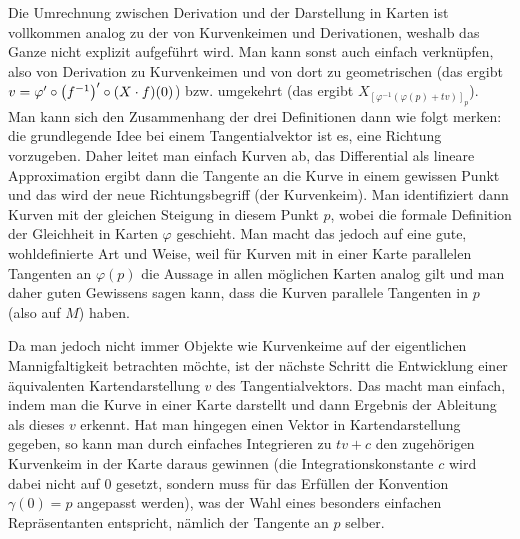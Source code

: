\documentclass[../H_Analysis_main.tex]{subfiles}
\begin{document}
Die Umrechnung zwischen Derivation und der Darstellung in Karten ist vollkommen analog zu der von Kurvenkeimen und Derivationen, weshalb das Ganze nicht explizit aufgeführt wird. Man kann sonst auch einfach verknüpfen, also von Derivation zu Kurvenkeimen und von dort zu geometrischen (das ergibt %
$v = \varphi' \circ \qty(f^{-1})' \circ \qty(X \cdot f)(0)$) bzw. umgekehrt (das ergibt $X_{[\varphi^{-1}(\varphi(p) + tv)]_p}$).\\


Man kann sich den Zusammenhang der drei Definitionen dann wie folgt merken: die grundlegende Idee bei einem Tangentialvektor ist es, eine Richtung vorzugeben. Daher leitet man einfach Kurven ab, das Differential als lineare Approximation ergibt dann die Tangente an die Kurve in einem gewissen Punkt und das wird der neue Richtungsbegriff (der Kurvenkeim). Man identifiziert dann Kurven mit der gleichen Steigung in diesem Punkt $p$, wobei die formale Definition der Gleichheit in Karten $\varphi$ geschieht. Man macht das jedoch auf eine gute, wohldefinierte Art und Weise, weil für Kurven mit in einer Karte parallelen Tangenten an $\varphi(p)$ die Aussage in allen möglichen Karten analog gilt und man daher guten Gewissens sagen kann, dass die Kurven parallele Tangenten in $p$ (also auf $M$) haben.

Da man jedoch nicht immer Objekte wie Kurvenkeime auf der eigentlichen Mannigfaltigkeit betrachten möchte, ist der nächste Schritt die Entwicklung einer äquivalenten Kartendarstellung $v$ des Tangentialvektors. Das macht man einfach, indem man die Kurve in einer Karte darstellt und dann Ergebnis der Ableitung als dieses $v$ erkennt. Hat man hingegen einen Vektor in Kartendarstellung gegeben, so kann man durch einfaches Integrieren zu $t v + c$ den zugehörigen Kurvenkeim in der Karte daraus gewinnen (die Integrationskonstante $c$ wird dabei nicht auf 0 gesetzt, sondern muss für das Erfüllen der Konvention $\gamma(0) = p$ angepasst werden), was der Wahl eines besonders einfachen Repräsentanten entspricht, nämlich der Tangente an $p$ selber.

\end{document}
